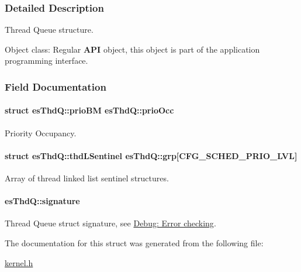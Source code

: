 \subsubsection{Detailed Description}
Thread Queue structure. 

\begin{DoxyParagraph}{Object class\-:}
Regular {\bfseries A\-P\-I} object, this object is part of the application programming interface. 
\end{DoxyParagraph}


\subsubsection{Field Documentation}
\hypertarget{structesThdQ_a27c44ea3949929a9790429f80e0416ff}{
\paragraph[{prio\-Occ}]{\setlength{\rightskip}{0pt plus 5cm}struct {\bf es\-Thd\-Q\-::prio\-B\-M}                es\-Thd\-Q\-::prio\-Occ}}\label{structesThdQ_a27c44ea3949929a9790429f80e0416ff}


Priority Occupancy. 

\hypertarget{structesThdQ_ab5c8c18bb5c015f16ae51bba644a05f5}{
\paragraph[{grp}]{\setlength{\rightskip}{0pt plus 5cm}struct {\bf es\-Thd\-Q\-::thd\-L\-Sentinel}                es\-Thd\-Q\-::grp\mbox{[}{\bf C\-F\-G\-\_\-\-S\-C\-H\-E\-D\-\_\-\-P\-R\-I\-O\-\_\-\-L\-V\-L}\mbox{]}}}\label{structesThdQ_ab5c8c18bb5c015f16ae51bba644a05f5}


Array of thread linked list sentinel structures. 

\hypertarget{structesThdQ_a2756407c94319267cbf5d30814182b4d}{
\paragraph[{signature}]{ es\-Thd\-Q\-::signature}}\label{structesThdQ_a2756407c94319267cbf5d30814182b4d}


Thread Queue struct signature, see \hyperlink{errors}{Debug\-: Error checking}. 



The documentation for this struct was generated from the following file\-:\begin{DoxyCompactItemize}
\item 
\hyperlink{kernel_8h}{kernel.\-h}\end{DoxyCompactItemize}
